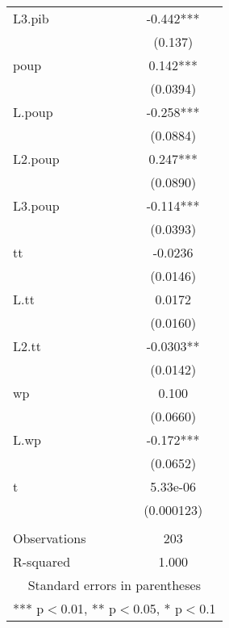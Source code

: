 \begin{tabular}{lc}
L3.pib & -0.442*** \\
 & (0.137) \\
poup & 0.142*** \\
 & (0.0394) \\
L.poup & -0.258*** \\
 & (0.0884) \\
L2.poup & 0.247*** \\
 & (0.0890) \\
L3.poup & -0.114*** \\
 & (0.0393) \\
tt & -0.0236 \\
 & (0.0146) \\
L.tt & 0.0172 \\
 & (0.0160) \\
L2.tt & -0.0303** \\
 & (0.0142) \\
wp & 0.100 \\
 & (0.0660) \\
L.wp & -0.172*** \\
 & (0.0652) \\
t & 5.33e-06 \\
 & (0.000123) \\
 &  \\
Observations & 203 \\
 R-squared & 1.000 \\ \hline
\multicolumn{2}{c}{ Standard errors in parentheses} \\
\multicolumn{2}{c}{ *** p$<$0.01, ** p$<$0.05, * p$<$0.1} \\
\end{tabular}
